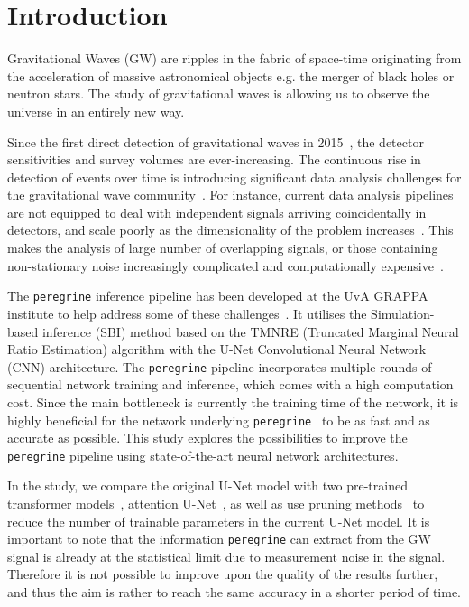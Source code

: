 \section{Introduction}
\label{sec:introduction}

Gravitational Waves (GW) are ripples in the fabric of space-time originating from the acceleration of massive astronomical objects e.g. the merger of black holes or neutron stars. The study of gravitational waves is allowing us to observe the universe in an entirely new way.

Since the first direct detection of gravitational waves in 2015~\cite{LIGO_2016}, the detector sensitivities and survey volumes are ever-increasing. The continuous rise in detection of events over time is introducing significant data analysis challenges for the gravitational wave community~\cite{bhardwaj2023peregrine}.
For instance, current data analysis pipelines are not equipped to deal with independent signals arriving coincidentally in detectors, and scale poorly as the dimensionality of the problem increases~\cite{alvey2023things}. This makes the analysis of large number of overlapping signals, or those containing non-stationary noise increasingly complicated and computationally expensive~\cite{bhardwaj2023peregrine}.

The \texttt{peregrine} inference pipeline has been developed at the UvA GRAPPA institute to help address some of these challenges~\cite{bhardwaj2023peregrine}. It utilises the Simulation-based inference (SBI) method based on the TMNRE (Truncated Marginal Neural Ratio Estimation) algorithm with the U-Net Convolutional Neural Network (CNN) architecture. The \texttt{peregrine} pipeline incorporates multiple rounds of sequential network training and inference, which comes with a high computation cost. Since the main bottleneck is currently the training time of the network, it is highly beneficial for the network underlying \texttt{peregrine}~\cite{bhardwaj2023peregrine} to be as fast and as accurate as possible. This study explores the possibilities to improve the \texttt{peregrine} pipeline using state-of-the-art neural network architectures.

In the study, we compare the original U-Net model with two pre-trained transformer models~\cite{Dosovitskiy_2021_ViT,Zerveas_2020_mvts}, attention U-Net~\cite{Oktay_2018_AUNet}, as well as use pruning methods~\cite{Fang_Ma_Song_Mi_Wang_2023} to reduce the number of trainable parameters in the current U-Net model. It is important to note that the information \texttt{peregrine} can extract from the GW signal is already at the statistical limit due to measurement noise in the signal. Therefore it is not possible to improve upon the quality of the results further, and thus the aim is rather to reach the same accuracy in a shorter period of time.

